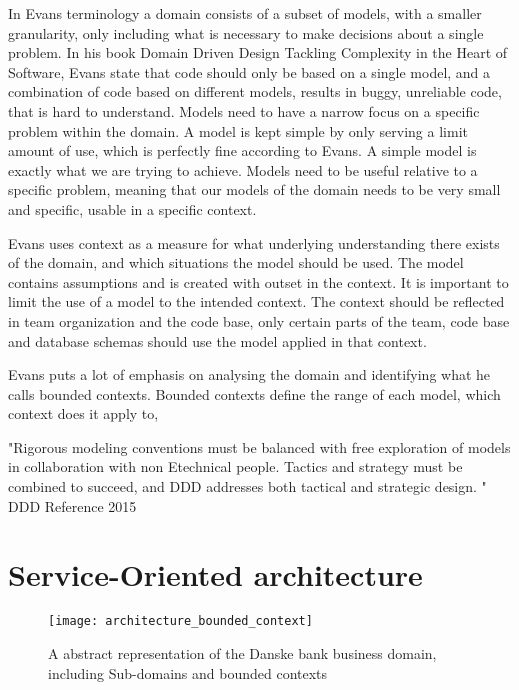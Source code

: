 In Evans terminology a domain consists of a subset of models, with a smaller granularity, only including what is necessary to make decisions about a single problem. In his book Domain Driven Design Tackling Complexity in the Heart of Software\cite{evans2004domain}, Evans state that code should only be based on a single model, and a combination of code based on different models, results in buggy, unreliable code, that is hard to understand. Models need to have a narrow focus on a specific problem within the domain. A model is kept simple by only serving a limit amount of use, which is perfectly fine according to Evans. A simple model is exactly what we are trying to achieve. Models need to be useful relative to a specific problem, meaning that our models of the domain needs to be very small and specific, usable in a specific context. 

Evans uses context as a measure for what underlying understanding there exists of the domain, and which situations the model should be used. The model contains assumptions and is created with outset in the context. It is important to limit the use of a model to the intended context. The context should be reflected in team organization and the code base, only certain parts of the team, code base and database schemas should use the model applied in that context.\cite[p.~335]{evans2004domain}

Evans puts a lot of emphasis on analysing the domain and identifying what he calls bounded contexts. Bounded contexts define the range of each model, which context does it apply to,



"Rigorous  modeling  conventions  must be balanced with free exploration of models in collaboration with non Etechnical people.  Tactics  and  strategy  must  be  combined  to  succeed,  and  DDD  addresses  both  tactical  and  strategic design. " DDD Reference 2015

\section{Service-Oriented architecture}





\begin{figure}[!htb]
  \texttt{[image: architecture\_bounded\_context]}  
  \caption{A abstract representation of the Danske bank business domain, including Sub-domains and bounded contexts}
  \label{fig:architecture_bounded_context}
\end{figure}

